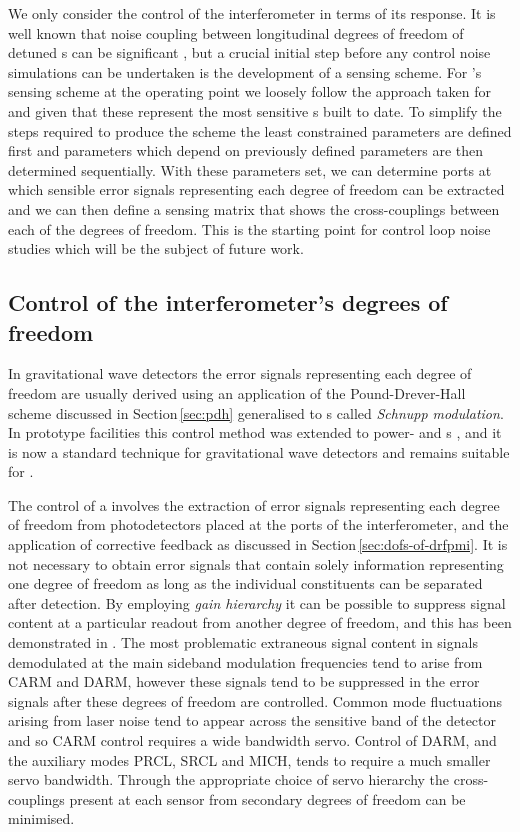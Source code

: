 We only consider the control of the interferometer in terms of its response. It is well known that noise coupling between longitudinal degrees of freedom of detuned \DRFPMI{}s can be significant \cite{Hild2007}, but a crucial initial step before any control noise simulations can be undertaken is the development of a sensing scheme. For \ETLF{}'s sensing scheme at the operating point we loosely follow the approach taken for \ALIGO{} \cite{Abbott2010} and \AVIRGO{} \cite{Vajente2008} given that these represent the most sensitive \DRFPMI{}s built to date. To simplify the steps required to produce the scheme the least constrained parameters are defined first and parameters which depend on previously defined parameters are then determined sequentially. With these parameters set, we can determine ports at which sensible error signals representing each degree of freedom can be extracted and we can then define a sensing matrix that shows the cross-couplings between each of the degrees of freedom. This is the starting point for control loop noise studies which will be the subject of future work.

\subsection{\label{sec:decoupled-sidebands}Control of the interferometer's degrees of freedom}
In gravitational wave detectors the error signals representing each degree of freedom are usually derived using an application of the Pound-Drever-Hall scheme discussed in Section\,\ref{sec:pdh} generalised to \MI{}s called \emph{Schnupp modulation}. In prototype facilities this control method was extended to power- \cite{Regehr1995} and \DRFPMI{}s \cite{Heinzel1998}, and it is now a standard technique for gravitational wave detectors and remains suitable for \ETLF{}.

The control of a \DRFPMI{} involves the extraction of error signals representing each degree of freedom from photodetectors placed at the ports of the interferometer, and the application of corrective feedback as discussed in Section\,\ref{sec:dofs-of-drfpmi}. It is not necessary to obtain error signals that contain solely information representing one degree of freedom as long as the individual constituents can be separated after detection. By employing \emph{gain hierarchy} it can be possible to suppress signal content at a particular readout from another degree of freedom, and this has been demonstrated in \LIGO{} \cite{Fritschel2001}. The most problematic extraneous signal content in signals demodulated at the main sideband modulation frequencies tend to arise from \gls{CARM} and \gls{DARM}, however these signals tend to be suppressed in the error signals after these degrees of freedom are controlled. Common mode fluctuations arising from laser noise tend to appear across the sensitive band of the detector and so \gls{CARM} control requires a wide bandwidth servo. Control of \gls{DARM}, and the auxiliary modes \gls{PRCL}, \gls{SRCL} and \gls{MICH}, tends to require a much smaller servo bandwidth. Through the appropriate choice of servo hierarchy the cross-couplings present at each sensor from secondary degrees of freedom can be minimised.

